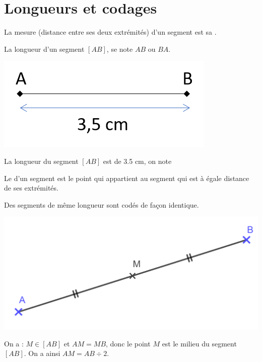 \documentclass[xcolor={dvipsnames}]{beamer}
\begin{document}
\section{Longueurs et codages}


\begin{frame}
	\begin{mydef}
		La mesure (distance entre ses deux extrémités) d'un segment est sa .
	\end{mydef}
	
	\begin{myprop}
		La longueur d'un segment $[AB]$, se note $AB$ ou $BA$. 
	\end{myprop}
	
	\begin{myex}
		
		\begin{center}
			\includegraphics[scale=0.6]{../img/lgr}
		\end{center}
		
		La longueur du segment $[AB]$ est de \num{3.5} cm, on note
	\end{myex}
\end{frame}


\begin{frame}
	\begin{mydef}
		Le  d'un segment est le point qui appartient au segment  qui est à égale distance de ses extrémités.
	\end{mydef}
	
	\begin{myrem}
		Des segments de même longueur sont codés de façon identique.
	\end{myrem}
	
	\begin{myex}
		\begin{center}
			\includegraphics[scale=0.2]{../img/milieu}
		\end{center}
		
		On a : $M \in [AB]$ et $AM = MB$, donc le point $M$ est le milieu du segment $[AB]$. On a ainsi $AM = AB \div 2$. 
	\end{myex}
\end{frame}
\end{document}
